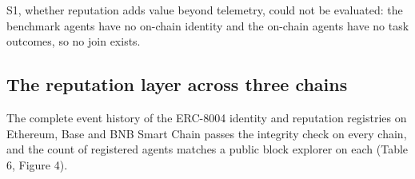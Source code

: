 \documentclass[
  11pt,
  a4paper,
]{article}
\begin{document}
S1, whether reputation adds value beyond telemetry, could not be
evaluated: the benchmark agents have no on-chain identity and the
on-chain agents have no task outcomes, so no join exists.

\hypertarget{the-reputation-layer-across-three-chains}{%
\subsection{The reputation layer across three
chains}\label{the-reputation-layer-across-three-chains}}

The complete event history of the ERC-8004 identity and reputation
registries on Ethereum, Base and BNB Smart Chain passes the integrity
check on every chain, and the count of registered agents matches a
public block explorer on each (Table 6, Figure 4).
\end{document}
